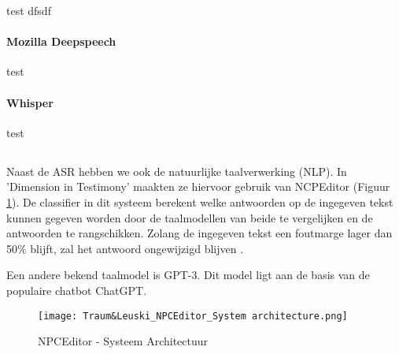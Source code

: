 test dfsdf

\paragraph{Mozilla Deepspeech}%

test

\paragraph{Whisper}%

test

\subsection{} \label{ssec:Natural Language Classifier}%

Naast de ASR hebben we ook de natuurlijke taalverwerking (NLP). In 'Dimension in Testimony' maakten ze hiervoor gebruik van NCPEditor (Figuur \ref{fig:NPCEArchitecture}). De classifier in dit systeem berekent welke antwoorden op de ingegeven tekst kunnen gegeven worden door de taalmodellen van beide te vergelijken en de antwoorden te rangschikken. Zolang de ingegeven tekst een foutmarge lager dan 50\% blijft, zal het antwoord ongewijzigd blijven \autocite{Leuski2010}.

Een andere bekend taalmodel is GPT-3. Dit model ligt aan de basis van de populaire chatbot ChatGPT.

\begin{figure}[h]
    \centering
    \texttt{[image: Traum\&Leuski\_NPCEditor\_System architecture.png]}
    \caption{NPCEditor - Systeem Architectuur \autocite{Leuski2010}}
    \label{fig:NPCEArchitecture}
\end{figure}

%
%
%
